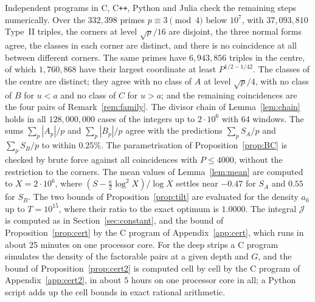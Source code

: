 \documentclass[aps,prd,twocolumn,superscriptaddress,nofootinbib,longbibliography,floatfix,showkeys,nobalancelastpage,amsmath,amssymb,10pt]{revtex4-2}
\theoremstyle{plain}
\theoremstyle{definition}
\theoremstyle{plain}
\newcommand{\Jc}{\mathcal{J}}
\begin{document}
Independent programs in C, C\texttt{++}, Python and Julia check the remaining steps numerically. Over the $332{,}398$ primes $p\equiv3\pmod4$ below $10^7$, with $37{,}093{,}810$ Type~II triples, the corners at level $\sqrt p/16$ are disjoint, the three normal forms agree, the classes in each corner are distinct, and there is no coincidence at all between different corners. The same primes have $6{,}943{,}856$ triples in the centre, of which $1{,}760{,}868$ have their largest coordinate at least $P^{1/2-1/42}$. The classes of the centre are distinct; they agree with no class of $A$ at level $\sqrt p/4$, with no class of $B$ for $u<a$ and no class of $C$ for $u>a$; and the remaining coincidences are the four pairs of Remark~\ref{rem:family}. The divisor chain of Lemma~\ref{lem:chain} holds in all $128{,}000{,}000$ cases of the integers up to $2\cdot10^6$ with 64 windows. The sums $\sum_p|A_p|/p$ and $\sum_p|B_p|/p$ agree with the predictions $\sum_pS_A/p$ and $\sum_pS_B/p$ to within $0.25\%$. The parametrisation of Proposition~\ref{prop:BC} is checked by brute force against all coincidences with $P\le4000$, without the restriction to the corners. The mean values of Lemma~\ref{lem:mean} are computed to $X=2\cdot10^6$, where $(S-\frac\kappa2\log^2X)/\log X$ settles near $-0.47$ for $S_A$ and $0.55$ for $S_B$. The two bounds of Proposition~\ref{prop:tilt} are evaluated for the density $a_0$ up to $T=10^{15}$, where their ratio to the exact optimum is $1.0000$. The integral $\Jc$ is computed as in Section~\ref{sec:constant}, and the bound of Proposition~\ref{prop:cert} by the C program of Appendix~\ref{app:cert}, which runs in about 25 minutes on one processor core. For the deep strips a C program simulates the density of the factorable pairs at a given depth and $G$, and the bound of Proposition~\ref{prop:cert2} is computed cell by cell by the C program of Appendix~\ref{app:cert2}, in about $5$ hours on one processor core in all; a Python script adds up the cell bounds in exact rational arithmetic.
\end{document}
